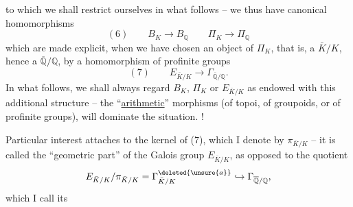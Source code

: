 to which we shall restrict ourselves in what follows -- we thus have canonical homomorphisms
\[
(6)\qquad B_K\longrightarrow B_{\mathbb Q}\qquad\Pi_K\longrightarrow\Pi_{\mathbb Q}
\]
which are made explicit, when we have chosen an object of $\Pi_K$, that is, a $\bar K/K$, hence a $\overline{\mathbb Q}/\mathbb Q$, by a homomorphism of profinite groups
\[
(7)\qquad E_{\bar K/K}\longrightarrow\Gamma_{\overline{\mathbb Q}/\mathbb Q}.
\]
In what follows, we shall always regard $B_K$, $\Pi_K$ or $E_{\bar K/K}$ as endowed with this additional structure --  the ``\uline{arithmetic}'' morphisms (of topoi, of groupoids, or of profinite groups), will dominate the situation. !

Particular interest attaches to the kernel of (7), which I denote by $\pi_{\bar K/K}$ -- it is called the ``geometric part'' of the Galois group $E_{\bar K/K}$, as opposed to the quotient
\[
E_{\bar K/K}/\pi_{\bar K/K}=\Gamma^{\deleted{\unsure{a}}}_{\bar K/K}\hookrightarrow\Gamma_{\overline{\mathbb Q}/\mathbb Q},
\]
which I call its
